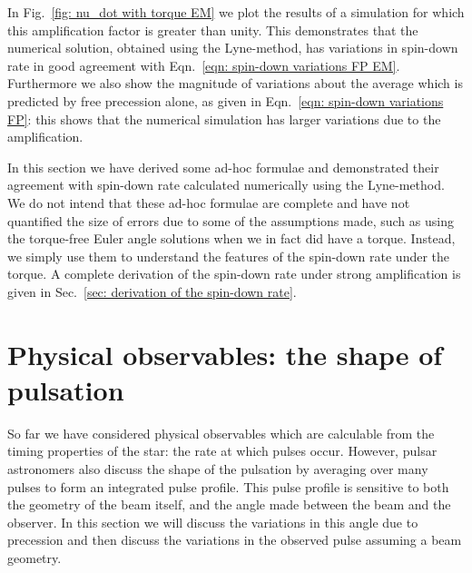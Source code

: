 \documentclass[../full_thesis/full_thesis.tex]{subfiles}
\begin{document}
In Fig.~\ref{fig: nu_dot with torque EM} we plot the results of a simulation
for which this amplification factor is greater than unity. This demonstrates
that the numerical solution, obtained using the Lyne-method, has variations in
spin-down rate in good agreement with Eqn.~\ref{eqn: spin-down variations FP
EM}.  Furthermore we also show the magnitude of variations about the average
which is predicted by free precession alone, as given in Eqn.~\eqref{eqn:
spin-down variations FP}: this shows that the numerical simulation has larger
variations due to the amplification.


In this section we have derived some ad-hoc formulae and demonstrated their
agreement with spin-down rate calculated numerically using the Lyne-method. We
do not intend that these ad-hoc formulae are complete and have not quantified
the size of errors due to some of the assumptions made, such as using the
torque-free Euler angle solutions when we in fact did have a torque. Instead,
we simply use them to understand the features of the spin-down rate under the
torque. A complete derivation of the spin-down rate under strong amplification
is given in Sec.~\ref{sec: derivation of the spin-down rate}.

\section{Physical observables: the shape of pulsation}

So far we have considered physical observables which are calculable from the
timing properties of the star: the rate at which pulses occur. However, pulsar
astronomers also discuss the shape of the pulsation by averaging over many
pulses to form an integrated pulse profile. This pulse profile is sensitive to
both the geometry of the beam itself, and the angle made between the beam and
the observer.  In this section we will discuss the variations in this angle due
to precession and then discuss the variations in the observed pulse assuming a
beam geometry.
\end{document}
